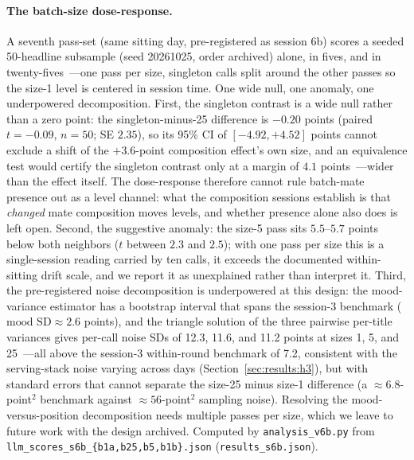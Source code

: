 \paragraph{The batch-size dose-response.} A seventh pass-set (same sitting day, pre-registered as session 6b) scores a seeded 50-headline subsample (seed 20261025, order archived) alone, in fives, and in twenty-fives~---one pass per size, singleton calls split around the other passes so the size-1 level is centered in session time. One wide null, one anomaly, one underpowered decomposition. First, the singleton contrast is a wide null rather than a zero point: the singleton-minus-25 difference is $-0.20$ points (paired $t=-0.09$, $n=50$; SE $2.35$), so its 95\% CI of $[-4.92, +4.52]$ points cannot exclude a shift of the $+3.6$-point composition effect's own size, and an equivalence test would certify the singleton contrast only at a margin of $4.1$ points~---wider than the effect itself. The dose-response therefore cannot rule batch-mate presence out as a level channel: what the composition sessions establish is that \emph{changed} mate composition moves levels, and whether presence alone also does is left open. Second, the suggestive anomaly: the size-5 pass sits $5.5$--$5.7$ points below both neighbors ($t$ between $2.3$ and $2.5$); with one pass per size this is a single-session reading carried by ten calls, it exceeds the documented within-sitting drift scale, and we report it as unexplained rather than interpret it. Third, the pre-registered noise decomposition is underpowered at this design: the mood-variance estimator has a bootstrap interval that spans the session-3 benchmark ($\text{mood SD}\approx2.6$ points), and the triangle solution of the three pairwise per-title variances gives per-call noise SDs of 12.3, 11.6, and 11.2 points at sizes 1, 5, and 25~---all above the session-3 within-round benchmark of 7.2, consistent with the serving-stack noise varying across days (Section~\ref{sec:results:h3}), but with standard errors that cannot separate the size-25 minus size-1 difference (a $\approx 6.8$-point$^2$ benchmark against $\approx 56$-point$^2$ sampling noise). Resolving the mood-versus-position decomposition needs multiple passes per size, which we leave to future work with the design archived. Computed by \texttt{analysis\_v6b.py} from \texttt{llm\_scores\_s6b\_\{b1a,b25,b5,b1b\}.json} (\texttt{results\_s6b.json}).

